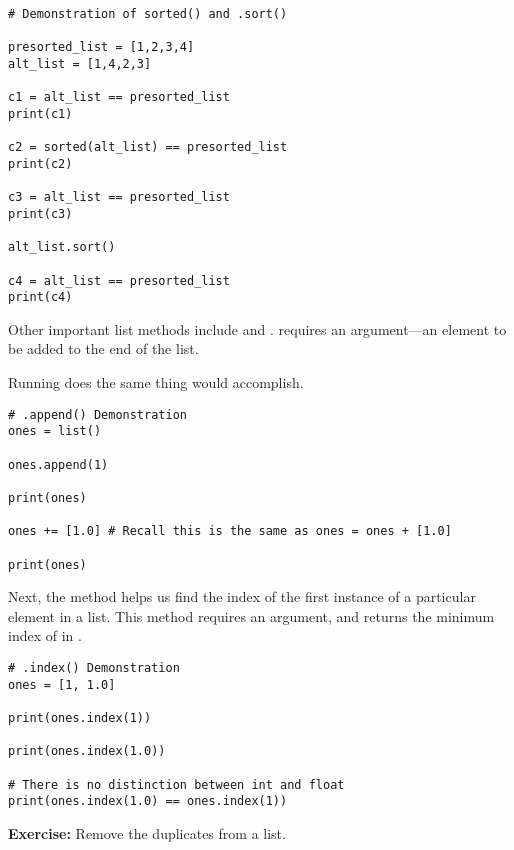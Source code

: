 \begin{lstlisting}
# Demonstration of sorted() and .sort()

presorted_list = [1,2,3,4]
alt_list = [1,4,2,3]

c1 = alt_list == presorted_list
print(c1)

c2 = sorted(alt_list) == presorted_list
print(c2)

c3 = alt_list == presorted_list
print(c3)

alt_list.sort()

c4 = alt_list == presorted_list
print(c4)
\end{lstlisting}


\smallskip

Other important list methods include  and .  requires an argument---an element to be added to the end of the list.

Running  does the same thing  would accomplish.

\begin{lstlisting}
# .append() Demonstration
ones = list()

ones.append(1)

print(ones)

ones += [1.0] # Recall this is the same as ones = ones + [1.0]

print(ones)
\end{lstlisting}


\smallskip

\noindent Next, the  method helps us find the index of the first instance of a particular element in a list. This method requires an argument, and  returns the minimum index of  in . 


\begin{lstlisting}
# .index() Demonstration
ones = [1, 1.0] 

print(ones.index(1))

print(ones.index(1.0)) 

# There is no distinction between int and float
print(ones.index(1.0) == ones.index(1)) 
\end{lstlisting}

\smallskip
\noindent \textbf{Exercise:} Remove the duplicates from a list.

